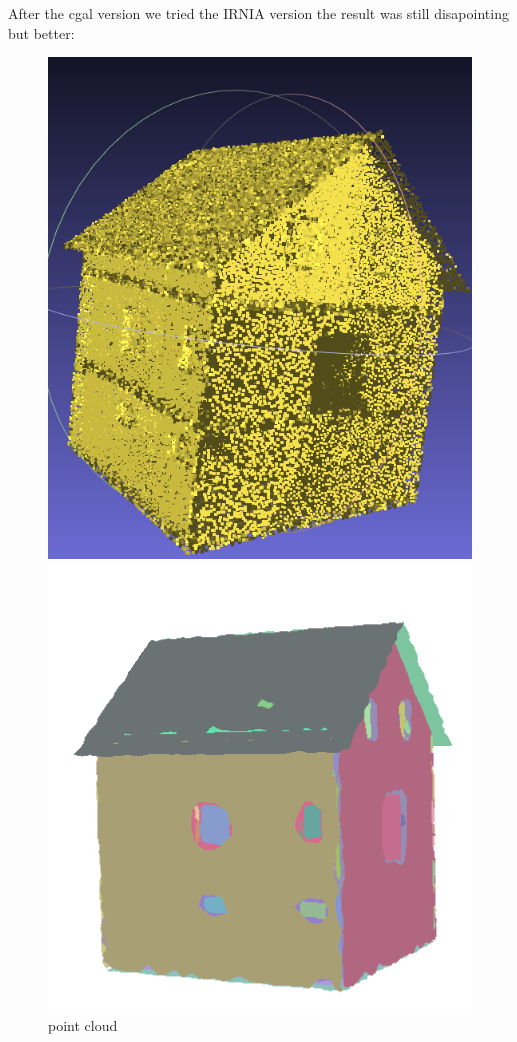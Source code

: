 \documentclass{article}
\begin{document}
After the cgal version we tried the IRNIA version the result was still disapointing but better: 
\vspace{\baselineskip}
\begin{figure}[H]
  \centering
  \begin{minipage}[t]{0.29\textwidth}
    \includegraphics[width=\textwidth]{../../images/screen_kinetic/ACJasmin_point_cloud.png}
    \caption*{point cloud}
  \end{minipage}
  \begin{minipage}[t]{0.29\textwidth}
    \includegraphics[width=\textwidth]{../../images/screen_kinetic/ACJasmin_primitive.png}

\end{minipage}
\end{figure}
\end{document}
